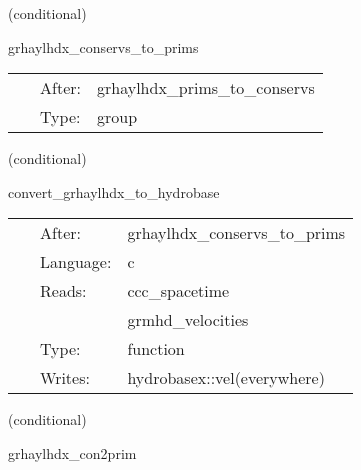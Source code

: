 \vspace{5mm}

   (conditional) 

\hspace{5mm} grhaylhdx\_conservs\_to\_prims 

\hspace{5mm}{\it compute primitive variables from conservatives } 


\hspace{5mm}

 \begin{tabular*}{160mm}{cll} 
~ & After:  & grhaylhdx\_prims\_to\_conservs \\ 
~ & Type:  & group \\ 
\end{tabular*} 


\vspace{5mm}

   (conditional) 

\hspace{5mm} convert\_grhaylhdx\_to\_hydrobase 

\hspace{5mm}{\it convert grhaylhdx variables to hydrobasex } 


\hspace{5mm}

 \begin{tabular*}{160mm}{cll} 
~ & After:  & grhaylhdx\_conservs\_to\_prims \\ 
~ & Language:  & c \\ 
~ & Reads:  & ccc\_spacetime \\ 
~& ~ &grmhd\_velocities\\ 
~ & Type:  & function \\ 
~ & Writes:  & hydrobasex::vel(everywhere) \\ 
\end{tabular*} 


\vspace{5mm}

   (conditional) 

\hspace{5mm} grhaylhdx\_con2prim 

\hspace{5mm}{\it compute primitive variables from conservatives } 


\hspace{5mm}

